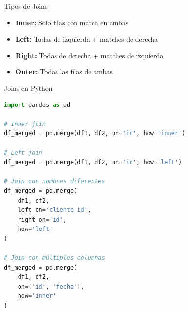 \documentclass[aspectratio=169]{beamer}
\begin{document}
\begin{frame}{Tipos de Joins}
\begin{center}
\end{center}

\begin{itemize}
    \item \textbf{Inner:} Solo filas con match en ambas
    \item \textbf{Left:} Todas de izquierda + matches de derecha
    \item \textbf{Right:} Todas de derecha + matches de izquierda
    \item \textbf{Outer:} Todas las filas de ambas
\end{itemize}
\end{frame}

\begin{frame}[fragile]{Joins en Python}
\begin{lstlisting}[language=Python]
import pandas as pd

# Inner join
df_merged = pd.merge(df1, df2, on='id', how='inner')

# Left join
df_merged = pd.merge(df1, df2, on='id', how='left')

# Join con nombres diferentes
df_merged = pd.merge(
    df1, df2,
    left_on='cliente_id',
    right_on='id',
    how='left'
)

# Join con múltiples columnas
df_merged = pd.merge(
    df1, df2, 
    on=['id', 'fecha'], 
    how='inner'
)
\end{lstlisting}
\end{frame}
\end{document}
